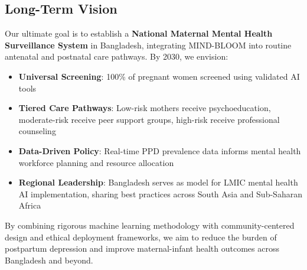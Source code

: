 \subsection{Long-Term Vision}

Our ultimate goal is to establish a \textbf{National Maternal Mental Health Surveillance System} in Bangladesh, integrating MIND-BLOOM into routine antenatal and postnatal care pathways. By 2030, we envision:

\begin{itemize}
    \item \textbf{Universal Screening}: 100\% of pregnant women screened using validated AI tools
    \item \textbf{Tiered Care Pathways}: Low-risk mothers receive psychoeducation, moderate-risk receive peer support groups, high-risk receive professional counseling
    \item \textbf{Data-Driven Policy}: Real-time PPD prevalence data informs mental health workforce planning and resource allocation
    \item \textbf{Regional Leadership}: Bangladesh serves as model for LMIC mental health AI implementation, sharing best practices across South Asia and Sub-Saharan Africa
\end{itemize}

By combining rigorous machine learning methodology with community-centered design and ethical deployment frameworks, we aim to reduce the burden of postpartum depression and improve maternal-infant health outcomes across Bangladesh and beyond.


